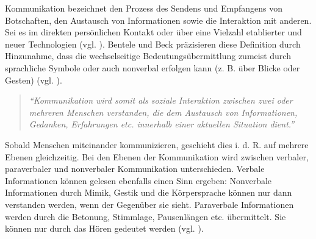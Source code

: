 
Kommunikation bezeichnet den Prozess des Sendens und Empfangens von Botschaften, den Austausch von Informationen sowie die Interaktion mit anderen. Sei es im direkten persönlichen Kontakt oder über eine Vielzahl etablierter und neuer Technologien (vgl. \cite[S. 18]{krcmar_communication_2016}).
Bentele und Beck präzisieren diese Definition durch Hinzunahme, dass die wechselseitige Bedeutungsübermittlung zumeist durch sprachliche Symbole oder auch nonverbal erfolgen kann (z. B. über Blicke oder Gesten) (vgl. \cite[S. 20]{bentele_information_1994}).

\begin{quote}
\textit{\enquote{Kommunikation wird somit als soziale Interaktion zwischen zwei oder mehreren Menschen verstanden, die dem Austausch von Informationen, Gedanken, Erfahrungen etc. innerhalb einer aktuellen Situation dient.}} \cite[S. 19]{becker_praxishandbuch_2018}
\end{quote}

Sobald Menschen miteinander kommunizieren, geschieht dies i. d. R. auf mehrere Ebenen gleichzeitig. Bei den Ebenen der Kommunikation wird zwischen verbaler, paraverbaler und nonverbaler Kommunikation unterschieden. Verbale Informationen können gelesen ebenfalls einen Sinn ergeben: Nonverbale Informationen durch Mimik, Gestik und die Körpersprache können nur dann verstanden werden, wenn der Gegenüber sie sieht. Paraverbale Informationen werden durch die Betonung, Stimmlage, Pausenlängen etc. übermittelt. Sie können nur durch das Hören gedeutet werden (vgl. \cite[S. 33]{ebert_formen_2018}).

